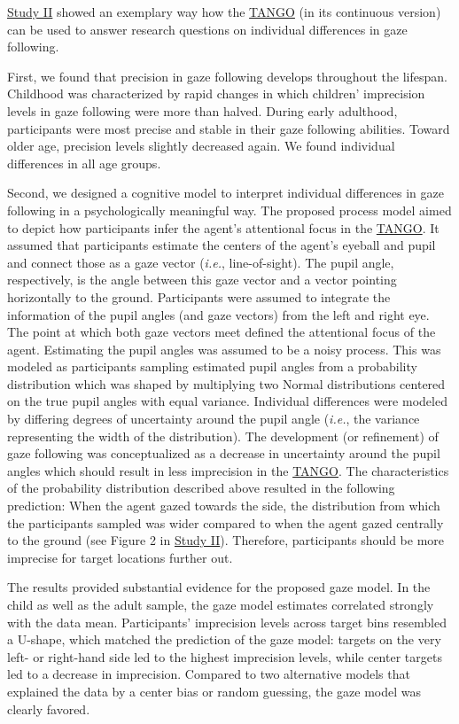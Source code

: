 \documentclass[
]{scrbook}
\begin{document}
\hyperref[studyII]{Study II} showed an exemplary way how the \hyperref[acronyms_TANGO]{TANGO} (in its continuous version) can be used to answer research questions on individual differences in gaze following.

First, we found that precision in gaze following develops throughout the lifespan. Childhood was characterized by rapid changes in which children' imprecision levels in gaze following were more than halved. During early adulthood, participants were most precise and stable in their gaze following abilities. Toward older age, precision levels slightly decreased again. We found individual differences in all age groups.

Second, we designed a cognitive model to interpret individual differences in gaze following in a psychologically meaningful way. The proposed process model aimed to depict how participants infer the agent's attentional focus in the \hyperref[acronyms_TANGO]{TANGO}. It assumed that participants estimate the centers of the agent's eyeball and pupil and connect those as a gaze vector (\emph{i.e.}, line-of-sight). The pupil angle, respectively, is the angle between this gaze vector and a vector pointing horizontally to the ground. Participants were assumed to integrate the information of the pupil angles (and gaze vectors) from the left and right eye. The point at which both gaze vectors meet defined the attentional focus of the agent. Estimating the pupil angles was assumed to be a noisy process. This was modeled as participants sampling estimated pupil angles from a probability distribution which was shaped by multiplying two Normal distributions centered on the true pupil angles with equal variance. Individual differences were modeled by differing degrees of uncertainty around the pupil angle (\emph{i.e.}, the variance representing the width of the distribution). The development (or refinement) of gaze following was conceptualized as a decrease in uncertainty around the pupil angles which should result in less imprecision in the \hyperref[acronyms_TANGO]{TANGO}. The characteristics of the probability distribution described above resulted in the following prediction: When the agent gazed towards the side, the distribution from which the participants sampled was wider compared to when the agent gazed centrally to the ground (see Figure 2 in \hyperref[studyII]{Study II}). Therefore, participants should be more imprecise for target locations further out.

The results provided substantial evidence for the proposed gaze model. In the child as well as the adult sample, the gaze model estimates correlated strongly with the data mean. Participants' imprecision levels across target bins resembled a U-shape, which matched the prediction of the gaze model: targets on the very left- or right-hand side led to the highest imprecision levels, while center targets led to a decrease in imprecision. Compared to two alternative models that explained the data by a center bias or random guessing, the gaze model was clearly favored.
\end{document}
